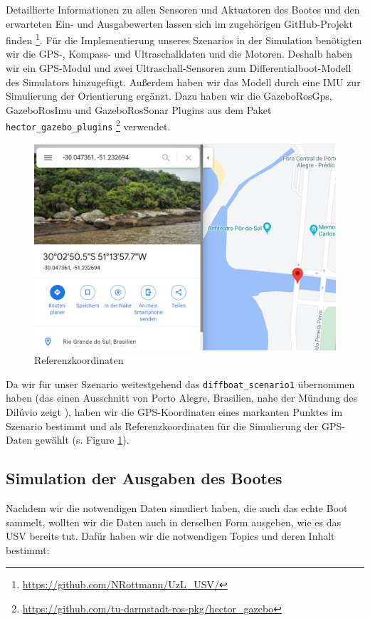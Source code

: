 \documentclass[11pt]{article}
\begin{document}
Detaillierte Informationen zu allen Sensoren und Aktuatoren des Bootes und den erwarteten Ein- und Ausgabewerten lassen sich im zugehörigen GitHub-Projekt finden \footnote{\url{https://github.com/NRottmann/UzL_USV/}}.
Für die Implementierung unseres Szenarios in der Simulation benötigten wir die GPS-, Kompass- und Ultraschalldaten und die Motoren. Deshalb haben wir ein GPS-Modul und zwei Ultraschall-Sensoren zum Differentialboot-Modell des Simulators hinzugefügt. Außerdem haben wir das Modell durch eine IMU zur Simulierung der Orientierung ergänzt. Dazu haben wir die GazeboRosGps, GazeboRosImu und GazeboRosSonar Plugins aus dem Paket \texttt{hector\_gazebo\_plugins}  \footnote{\url{https://github.com/tu-darmstadt-ros-pkg/hector_gazebo}} verwendet.

\begin{figure}
	\includegraphics[width=\linewidth]{reference.png}
	\caption{Referenzkoordinaten}
	\label{reference}
\end{figure}

Da wir für unser Szenario weitestgehend das \texttt{diffboat\_scenario1} übernommen haben (das einen Ausschnitt von Porto Alegre, Brasilien, nahe der Mündung des Dilúvio zeigt \cite{paravisi2019}), haben wir die GPS-Koordinaten eines markanten Punktes im Szenario bestimmt und als Referenzkoordinaten für die Simulierung der GPS-Daten gewählt (s. Figure \ref{reference}).

\subsection{Simulation der Ausgaben des Bootes}

Nachdem wir die notwendigen Daten simuliert haben, die auch das echte Boot sammelt, wollten wir die Daten auch in derselben Form ausgeben, wie es das USV bereits tut. Dafür haben wir die notwendigen Topics und deren Inhalt bestimmt:
\end{document}
